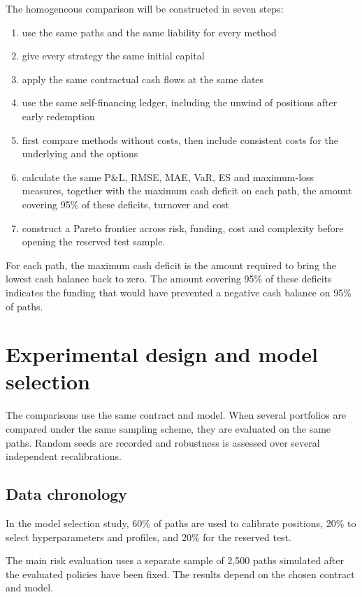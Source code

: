\documentclass[12pt,a4paper]{article}
\newcommand{\1}{\mathbf{1}}
\begin{document}
\noindent The homogeneous comparison will be constructed in seven steps:

\begin{enumerate}
\item use the same paths and the same liability for every method
\item give every strategy the same initial capital
\item apply the same contractual cash flows at the same dates
\item use the same self-financing ledger, including the unwind of positions after early redemption
\item first compare methods without costs, then include consistent costs for the underlying and the options
\item calculate the same P\&L, RMSE, MAE, VaR, ES and maximum-loss measures, together with the maximum cash deficit on each path, the amount covering 95\% of these deficits, turnover and cost
\item construct a Pareto frontier across risk, funding, cost and complexity before opening the reserved test sample.
\end{enumerate}

For each path, the maximum cash deficit is the amount required to bring the lowest
cash balance back to zero. The amount covering 95\% of these deficits indicates the
funding that would have prevented a negative cash balance on 95\% of paths.

\section{Experimental design and model selection}

The comparisons use the same contract and model. When several portfolios are compared under the same sampling scheme, they are evaluated on the same paths. Random seeds are
recorded and robustness is assessed over several independent recalibrations.

\subsection{Data chronology}

In the model selection study, 60\% of paths are used to calibrate positions, 20\% to select hyperparameters and profiles, and 20\% for the reserved test.

The main risk evaluation uses a separate sample of 2,500 paths simulated after the evaluated policies have been fixed. The results depend on the chosen contract and model.
\end{document}

